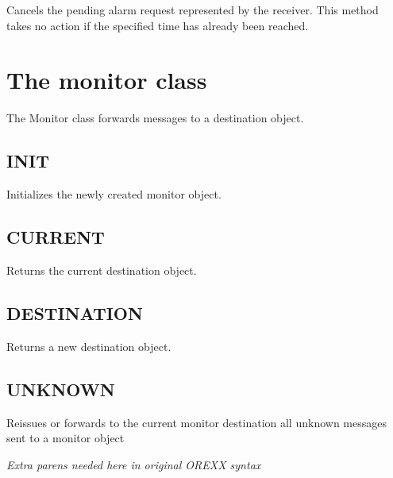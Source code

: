 Cancels the pending alarm request represented by the receiver. This
method takes no action if the specified time has already been reached.

\section{The monitor class}\label{the-monitor-class}

The Monitor class forwards messages to a destination object.



\subsection{INIT}\label{init-1}

Initializes the newly created monitor object.



\subsection{CURRENT}\label{current}

Returns the current destination object.



\subsection{DESTINATION}\label{destination}

Returns a new destination object.



\subsection{UNKNOWN}\label{unknown-1}

Reissues or forwards to the current monitor destination all unknown
messages sent to a monitor object



\emph{Extra parens needed here in original OREXX syntax}

